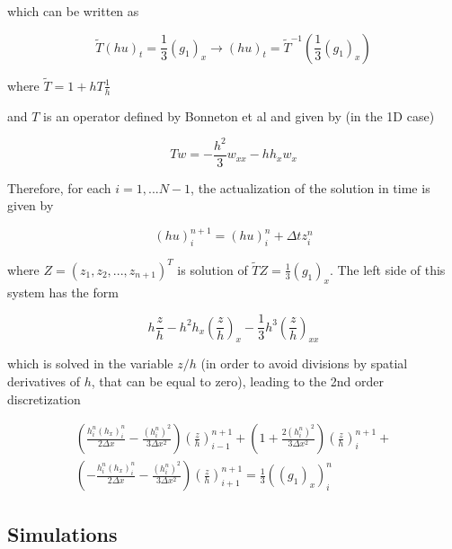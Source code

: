 \noindent which can be written as

\begin{equation}
    \tilde{T} (hu)_t = \frac{1}{3}\left(g_1 \right)_x \rightarrow (hu)_t = \tilde{T}^{-1}\left(\frac{1}{3}\left(g_1 \right)_x\right)
\end{equation}

\noindent where $\tilde{T} = 1 + hT\frac{1}{h} $

\noindent and $T$ is an operator defined by Bonneton et al and given by (in the 1D case)

\begin{equation}
   Tw = -\frac{h^2}{3}w_{xx} - hh_xw_x
\end{equation}

\indent Therefore, for each $i=1,...N-1$, the actualization of the solution in time is given by

\begin{equation}
(hu)_i^{n+1} = (hu)_i^n + \Delta t z_i^n
\end{equation}

\noindent where $Z = (z_1,z_2,...,z_{n+1})^T$ is solution of $\tilde{T}Z = \frac{1}{3}\left(g_1 \right)_x$. The left side of this system has the form

\begin{equation}
h\frac{z}{h} - h^2h_x \left( \frac{z}{h} \right)_x - \frac{1}{3}h^3\left( \frac{z}{h}\right)_{xx}
\end{equation}

\noindent which is solved in the variable $z/h$ (in order to avoid divisions by spatial derivatives of $h$, that can be equal to zero), leading to the 2nd order discretization

\begin{equation}
\begin{split}
\left( \frac{h_i^n(h_x)_i^n}{2\Delta x} - \frac{(h_i^n)^2}{3\Delta x^2} \right)  \left( \frac{z}{h} \right)_{i-1}^{n+1} + 
 \left( 1 + \frac{2(h_i^n)^2}{3\Delta x^2} \right)\left( \frac{z}{h} \right)_{i}^{n+1} + \\
  \left( -\frac{h_i^n(h_x)_i^n}{2\Delta x} - \frac{(h_i^n)^2}{3\Delta x^2} \right)\left( \frac{z}{h} \right)_{i+1}^{n+1} = \frac{1}{3} \left(\left( g_1 \right)_x\right)_i^n
  \end{split}
\end{equation}

\subsection{Simulations}

